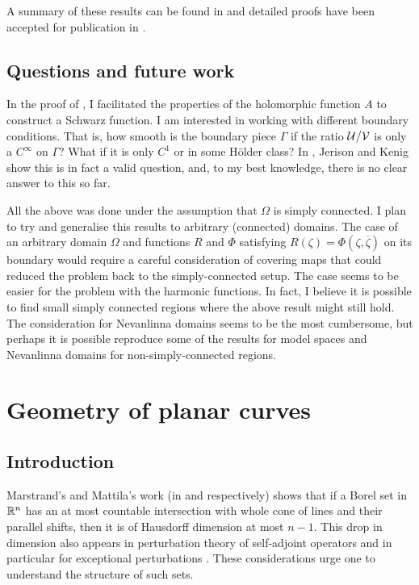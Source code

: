 \documentclass[11pt]{amsart} %
\theoremstyle{remark} %
\theoremstyle{definition} %
\numberwithin{equation}{section} %
\newcommand{\0}[1]{\overline{#1}} %
\newcommand{\1}[1]{\tilde{#1}} %
\newcommand{\2}[1]{{}_{|#1}} %
\begin{document}
\smallskip

A summary of these results can be found in \cite{VarVol2021_note} and detailed proofs have been accepted for publication in \cite{VarVol2021ep_2022}.

\subsection*{Questions and future work}	%
In the proof of , I facilitated the properties of the holomorphic function $A$ to construct a Schwarz function. I am interested in working with different boundary conditions. That is, how smooth is the boundary piece $Γ$ if the ratio ${\mathcal{U}}/{\mathcal{V}}$ is only a $C^\infty$ on $Γ$? What if it is only $C^1$ or in some H{\"o}lder class? In \cite{JerKen1982}, Jerison and Kenig show this is in fact a valid question, and, to my best knowledge, there is no clear answer to this so far.

\smallskip

All the above was done under the assumption that $Ω$ is simply connected. I plan to try and generalise this results to arbitrary (connected) domains. The case of an arbitrary domain $Ω$ and functions $R$ and $Φ$ satisfying $R(ζ)=Φ(ζ,\0{ζ})$ on its boundary would require a careful consideration of covering maps that could reduced the problem back to the simply-connected setup. The case seems to be easier for the problem with the harmonic functions. In fact, I believe it is possible to find small simply connected regions where the above result might still hold. The consideration for Nevanlinna domains seems to be the most cumbersome, but perhaps it is possible reproduce some of the results for model spaces and Nevanlinna domains for non-simply-connected regions.


\section{Geometry of planar curves}	\label{sec:Marstrand}

\subsection*{Introduction}	%
Marstrand's and Mattila's work (in \cite{Mar1954} and \cite{Mat1975} respectively) shows that if a Borel set in ${\mathbb{R}}^n$ has an at most countable intersection with whole cone of lines and their parallel shifts, then it is of Hausdorff dimension at most $n-1$. This drop in dimension also appears in perturbation theory of self-adjoint operators and in particular for exceptional perturbations \cite{LiaTreVol2020}. These considerations urge one to understand the structure of such sets.
\end{document}
